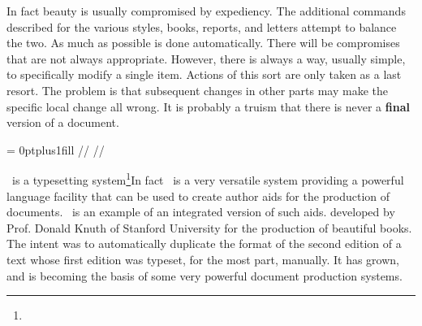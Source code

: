 In fact beauty is usually compromised by expediency. The additional commands
described for the various styles, books, reports, and letters attempt to
balance the two. As much as possible is done automatically. There will be
compromises that are not always appropriate. However, there is always a way,
usually simple, to specifically modify a single item. Actions of this sort
are only taken as a last resort. The problem is that subsequent changes in
other parts may make the specific local change all wrong. It is probably a
truism that there is never  a {\bf final} version of a document. 


\begingroup
{}





\ejectpage
\endgroup
\begingroup
\def\ftn{}%
\def\cr{ }%
\let\twelvett=\tentt %
 \specialpagestyle
{} = {  }
\maketoclist
\endgroup
\ejectpage
\ifodd\pageno \vglue 0ptplus1fill
              \pslide \intex// // \fi
\endprelude
{}

\def\cqu{\let\folio=\relax 
\cquote{Beauty in things exists in the mind which contemplates them.}{Essays
on Tragedy, David~Hume (1711-1776)}
}



\chapterhead{Intro}{\tex\cr and\cr \intex}

\tex\ is a typesetting 
system\footnote{\dagger}{In fact \tex\ is a very versatile system providing
a powerful language facility that can be used to create author aids
for the production of documents. \intex\ is an example of an integrated
version of such aids.}
developed by Prof. Donald Knuth of Stanford
University for the production of beautiful books. The intent was to
automatically duplicate the format of the second edition of a
text whose first edition was typeset, for the most part, manually. It has
grown, and is becoming the basis of some very powerful document production
systems.

